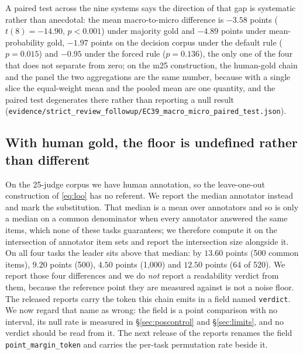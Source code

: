 \documentclass{article}
\newcommand{\ids}[1]{\texttt{\small #1}} %
\begin{document}
A paired test across the nine systems says the direction of that gap is systematic rather than anecdotal: the mean macro-to-micro difference is $-3.58$ points ($t(8) = -14.90$, $p < 0.001$) under majority gold and $-4.89$ points under mean-probability gold, $-1.97$ points on the decision corpus under the default rule ($p = 0.015$) and $-0.95$ under the forced rule ($p = 0.136$), the only one of the four that does not separate from zero; on the m25 construction, the human-gold chain and the panel the two aggregations are the same number, because with a single slice the equal-weight mean and the pooled mean are one quantity, and the paired test degenerates there rather than reporting a null result (\ids{evidence/strict\_review\_followup/EC39\_macro\_micro\_paired\_test.json}).
\subsection{With human gold, the floor is undefined rather than different}
\label{sec:human} On the 25-judge corpus we have human annotation, so the leave-one-out construction of \eqref{eq:loo} has no referent. We report the median annotator instead and mark the substitution. That median is a mean over annotators and so is only a median on a common denominator when every annotator answered the same items, which none of these tasks guarantees; we therefore compute it on the intersection of annotator item sets and report the intersection size alongside it. On all four tasks the leader sits above that median: by $13.60$ points (500 common items), $9.20$ points (500), $4.50$ points (1,000) and $12.50$ points (64 of 520). We report those four differences and we do \emph{not} report a readability verdict from them, because the reference point they are measured against is not a noise floor. The released reports carry the token this chain emits in a field named \texttt{verdict}. We now regard that name as wrong: the field is a point comparison with no interval, its null rate is measured in \S\ref{sec:poscontrol} and \S\ref{sec:limits}, and no verdict should be read from it. The next release of the reports renames the field \texttt{point\_margin\_token} and carries the per-task permutation rate beside it.
\end{document}
